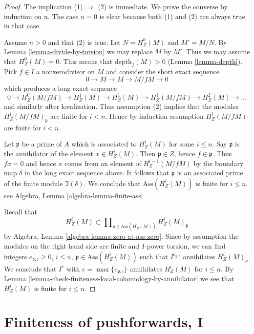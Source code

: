 \begin{proof}
The implication (1) $\Rightarrow$ (2) is immediate. We prove the converse
by induction on $n$. The case $n = 0$ is clear because both (1) and
(2) are always true in that case.

\medskip\noindent
Assume $n > 0$ and that (2) is true. Let $N = H^0_Z(M)$ and $M' = M/N$.
By Lemma \ref{lemma-divide-by-torsion} we may replace $M$ by $M'$.
Thus we may assume that $H^0_Z(M) = 0$.
This means that $\text{depth}_I(M) > 0$ (Lemma \ref{lemma-depth}).
Pick $f \in I$ a nonzerodivisor on $M$ and consider the short
exact sequence
$$
0 \to M \to M \to M/fM \to 0
$$
which produces a long exact sequence
$$
0 \to H^0_Z(M/fM) \to H^1_Z(M) \to H^1_Z(M) \to H^1_Z(M/fM) \to
H^2_Z(M) \to \ldots
$$
and similarly after localization. Thus assumption (2) implies that
the modules $H^i_Z(M/fM)_\mathfrak p$ are finite for $i < n$. Hence
by induction assumption $H^i_Z(M/fM)$ are finite for $i < n$.

\medskip\noindent
Let $\mathfrak p$ be a prime of $A$ which is associated to
$H^i_Z(M)$ for some $i \leq n$. Say $\mathfrak p$ is the annihilator
of the element $x \in H^i_Z(M)$. Then $\mathfrak p \in Z$, hence
$f \in \mathfrak p$. Thus $fx = 0$ and hence $x$ comes from an
element of $H^{i - 1}_Z(M/fM)$ by the boundary map $\delta$ in the long
exact sequence above. It follows that $\mathfrak p$ is an associated
prime of the finite module $\Im(\delta)$. We conclude that
$\text{Ass}(H^i_Z(M))$ is finite for $i \leq n$, see
Algebra, Lemma \ref{algebra-lemma-finite-ass}.

\medskip\noindent
Recall that
$$
H^i_Z(M) \subset
\prod\nolimits_{\mathfrak p \in \text{Ass}(H^i_Z(M))}
H^i_Z(M)_\mathfrak p
$$
by Algebra, Lemma \ref{algebra-lemma-zero-at-ass-zero}. Since by
assumption the modules on the right hand side are finite and $I$-power
torsion, we can find integers $e_{\mathfrak p, i} \geq 0$, $i \leq n$,
$\mathfrak p \in \text{Ass}(H^i_Z(M))$ such that
$I^{e_{\mathfrak p, i}}$ annihilates $H^i_Z(M)_\mathfrak p$. We conclude
that $I^e$ with $e = \max\{e_{\mathfrak p, i}\}$ annihilates $H^i_Z(M)$
for $i \leq n$. By
Lemma \ref{lemma-check-finiteness-local-cohomology-by-annihilator}
we see that $H^i_Z(M)$ is finite for $i \leq n$.
\end{proof}




\section{Finiteness of pushforwards, I}
\label{section-finiteness-pushforward}

